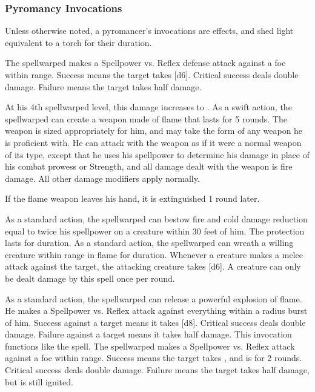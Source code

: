         \subsubsection{Pyromancy Invocations}
            Unless otherwise noted, a pyromancer's invocations are  effects, and shed light equivalent to a torch for their duration.

            The spellwarped makes a Spellpower vs. Reflex defense attack against a foe within \rngmed range.
            Success means the target takes [d6].
            Critical success deals double damage.
            Failure means the target takes half damage.
            \par At his 4th spellwarped level, this damage increases to .
            As a swift action, the spellwarped can create a weapon made of flame that lasts for 5 rounds.
            The weapon is sized appropriately for him, and may take the form of any weapon he is proficient with.
            He can attack with the weapon as if it were a normal weapon of its type, except that he uses his spellpower to determine his damage in place of his combat prowess or Strength, and all damage dealt with the weapon is fire damage.
            All other damage modifiers apply normally.
            \par If the flame weapon leaves his hand, it is extinguished 1 round later.

            As a standard action, the spellwarped can bestow fire and cold damage reduction equal to twice his spellpower on a creature within 30 feet of him.
            The protection lasts for \durshort duration.
            As a standard action, the spellwarped can wreath a willing creature within \rngclose range in flame for \durshort duration.
            Whenever a creature makes a melee attack against the target, the attacking creature takes [d6].
            A creature can only be dealt damage by this spell once per round.

            As a standard action, the spellwarped can release a powerful explosion of flame.
            He makes a Spellpower vs. Reflex attack against everything within a \areamed radius burst of him.
            Success against a target means it takes [d8].
            Critical success deals double damage.
            Failure against a target means it takes half damage.
            This invocation functions like the  spell.
            The spellwarped makes a Spellpower vs. Reflex attack against a foe within \rngclose range.
            Success means the target takes , and is \ignited for 2 rounds.
            Critical success deals double damage.
            Failure means the target takes half damage, but is still ignited.

